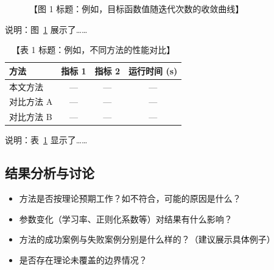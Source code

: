 
\begin{figure}[htbp]
    \centering
    \caption{【图 1 标题：例如，目标函数值随迭代次数的收敛曲线】}
    \label{fig:convergence}
\end{figure}

说明：图~\ref{fig:convergence} 展示了……


\begin{table}[htbp]
    \centering
    \caption{【表 1 标题：例如，不同方法的性能对比】}
    \label{tab:results}
    \begin{tabular}{lccc}
        \toprule
        方法 & 指标 1 & 指标 2 & 运行时间 (s) \\
        \midrule
        本文方法 & --- & --- & --- \\
        对比方法 A & --- & --- & --- \\
        对比方法 B & --- & --- & --- \\
        \bottomrule
    \end{tabular}
\end{table}

说明：表~\ref{tab:results} 显示了……

\subsection{结果分析与讨论}

\begin{itemize}
    \item 方法是否按理论预期工作？如不符合，可能的原因是什么？
    \item 参数变化（学习率、正则化系数等）对结果有什么影响？
    \item 方法的成功案例与失败案例分别是什么样的？（建议展示具体例子）
    \item 是否存在理论未覆盖的边界情况？
\end{itemize}
